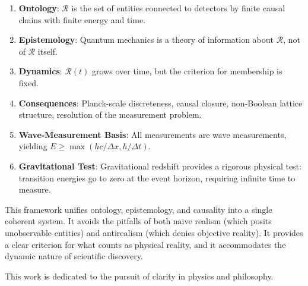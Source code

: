 \documentclass[aps,preprint,showpacs,showkeys]{revtex4}
\begin{document}
\begin{enumerate}
\item \textbf{Ontology}: $\mathcal{R}$ is the set of entities connected to
detectors by finite causal chains with finite energy and time.

\item \textbf{Epistemology}: Quantum mechanics is a theory of information
about $\mathcal{R}$, not of $\mathcal{R}$ itself.

\item \textbf{Dynamics}: $\mathcal{R}(t)$ grows over time, but the criterion
for membership is fixed.

\item \textbf{Consequences}: Planck-scale discreteness, causal closure,
non-Boolean lattice structure, resolution of the measurement problem.

\item \textbf{Wave-Measurement Basis}: All measurements are wave
measurements, yielding $E \ge \max(hc/\Delta x, h/\Delta t)$.

\item \textbf{Gravitational Test}: Gravitational redshift provides a
rigorous physical test: transition energies go to zero at the event horizon,
requiring infinite time to measure.
\end{enumerate}

This framework unifies ontology, epistemology, and causality into a single
coherent system. It avoids the pitfalls of both naive realism (which posits
unobservable entities) and antirealism (which denies objective reality). It
provides a clear criterion for what counts as physical reality, and it
accommodates the dynamic nature of scientific discovery.

\begin{acknowledgments}
This work is dedicated to the pursuit of clarity in physics and philosophy.
\end{acknowledgments}
\end{document}
